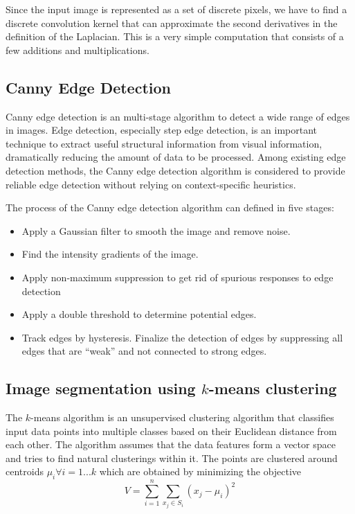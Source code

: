 \documentclass[conference]{IEEEtran}
\begin{document}
Since the input image is represented as a set of discrete pixels, we
have to find a discrete convolution kernel that can approximate the
second derivatives in the definition of the Laplacian. This is a very
simple computation that consists of a few additions and
multiplications.

\subsection{Canny Edge Detection}
Canny edge detection\cite{Canny86} is an multi-stage algorithm to
detect a wide range of edges in images. Edge detection, especially
step edge detection, is an important technique to extract useful
structural information from visual information, dramatically reducing
the amount of data to be processed. Among existing edge detection
methods, the Canny edge detection algorithm is considered to provide
reliable edge detection without relying on context-specific
heuristics.

The process of the Canny edge detection algorithm can defined in five
stages:

\begin{itemize}
\item Apply a Gaussian filter to smooth the image and remove noise.
\item Find the intensity gradients of the image.
\item Apply non-maximum suppression to get rid of spurious
  responses to edge detection
\item Apply a double threshold to determine potential edges.
\item Track edges by hysteresis. Finalize the detection of
  edges by suppressing all edges that are ``weak'' and not
  connected to strong edges.
\end{itemize}

\subsection{Image segmentation using $k$-means clustering}
The $k$-means algorithm is an unsupervised clustering algorithm that
classifies input data points into multiple classes based on their
Euclidean distance from each other. The algorithm assumes that the
data features form a vector space and tries to find natural
clusterings within it. The points are clustered around
centroids \begin{math}\mu_{i} \forall i = 1...k\end{math} which are
  obtained by minimizing the objective
\begin{equation}
	V = \sum\limits_{i=1}^n \sum\limits_{x_{j}\in S_{i}} (x_{j} - \mu_{i})^2
\end{equation}
\end{document}
